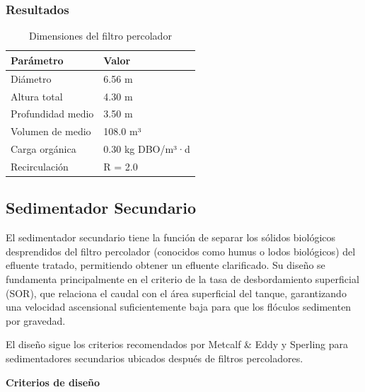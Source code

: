 \documentclass[12pt,a4paper]{article}
\begin{document}
\subsubsection{Resultados}

\begin{table}[H]
\centering
\caption{Dimensiones del filtro percolador}
\begin{tabular}{ll}
\toprule
Parámetro & Valor \\
\midrule
Diámetro & 6.56 m \\
Altura total & 4.30 m \\
Profundidad medio & 3.50 m \\
Volumen de medio & 108.0 m³ \\
Carga orgánica & 0.30 kg DBO/m³·d \\
Recirculación & R = 2.0 \\
\bottomrule
\end{tabular}
\end{table}

\subsection{Sedimentador Secundario}

El sedimentador secundario tiene la función de separar los sólidos biológicos desprendidos del filtro percolador (conocidos como humus o lodos biológicos) del efluente tratado, permitiendo obtener un efluente clarificado. Su diseño se fundamenta principalmente en el criterio de la tasa de desbordamiento superficial (SOR), que relaciona el caudal con el área superficial del tanque, garantizando una velocidad ascensional suficientemente baja para que los flóculos sedimenten por gravedad.

El diseño sigue los criterios recomendados por Metcalf \& Eddy \cite{metcalf2014} y Sperling \cite{sperling2007} para sedimentadores secundarios ubicados después de filtros percoladores.

\textbf{Criterios de diseño}
\end{document}
